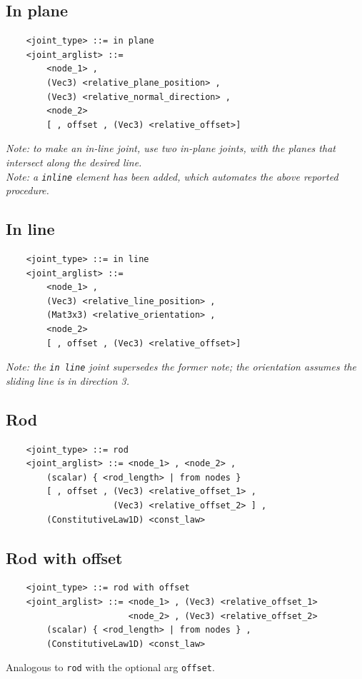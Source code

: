 \subsection{In plane}
\begin{verbatim}
    <joint_type> ::= in plane
    <joint_arglist> ::= 
        <node_1> , 
        (Vec3) <relative_plane_position> ,
        (Vec3) <relative_normal_direction> ,
        <node_2>
        [ , offset , (Vec3) <relative_offset>]
\end{verbatim}
{\em
    Note: to make an in-line joint, use two in-plane joints, with the
    planes that intersect along the desired line. \\
    Note: a \texttt{inline} element has been added, which automates the above
    reported procedure.
}

\subsection{In line}
\begin{verbatim}
    <joint_type> ::= in line
    <joint_arglist> ::= 
        <node_1> , 
        (Vec3) <relative_line_position> ,
        (Mat3x3) <relative_orientation> ,
        <node_2>
        [ , offset , (Vec3) <relative_offset>]
\end{verbatim}
{\em 
    Note: the \texttt{in line} joint supersedes the former note; the orientation
    assumes the sliding line is in direction 3.
}

\subsection{Rod}
\begin{verbatim}
    <joint_type> ::= rod 
    <joint_arglist> ::= <node_1> , <node_2> , 
        (scalar) { <rod_length> | from nodes }
        [ , offset , (Vec3) <relative_offset_1> , 
                     (Vec3) <relative_offset_2> ] ,
        (ConstitutiveLaw1D) <const_law>
\end{verbatim}

\subsection{Rod with offset}
\begin{verbatim}
    <joint_type> ::= rod with offset
    <joint_arglist> ::= <node_1> , (Vec3) <relative_offset_1>
                        <node_2> , (Vec3) <relative_offset_2>
        (scalar) { <rod_length> | from nodes } ,
        (ConstitutiveLaw1D) <const_law>
\end{verbatim}
Analogous to \texttt{rod} with the optional arg \texttt{offset}.    

